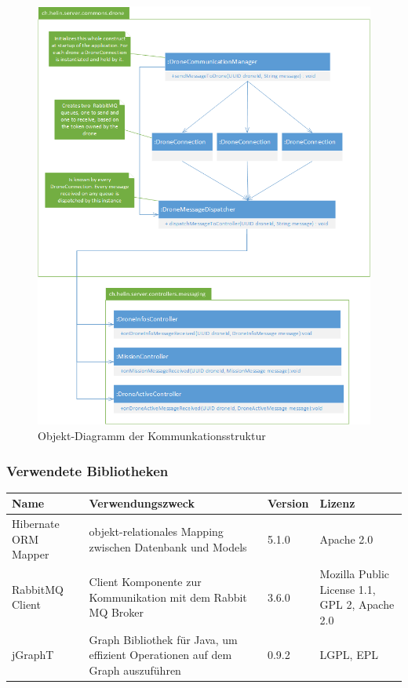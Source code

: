 \begin{figure}[H]
	\centering
	\includegraphics[width=0.8\paperwidth] {images/drone-communication-diagram.png}
	\caption{Objekt-Diagramm der Kommunkationsstruktur}
	\label{fig:drone-communication-diagram}
\end{figure}

\subsubsection{Verwendete Bibliotheken}


\begin{tabularx}{\textwidth}{|l|X|l|X|}
	\hline
	\textbf{Name} & \textbf{Verwendungszweck} & \textbf{Version} & \textbf{Lizenz} \\
	\hline \hline
	Hibernate ORM Mapper & objekt-relationales Mapping zwischen Datenbank und Models  & 5.1.0 & Apache 2.0\\
	\hline 
	RabbitMQ Client & Client Komponente zur Kommunikation mit dem Rabbit MQ Broker & 3.6.0 &  Mozilla Public License 1.1, GPL 2, Apache 2.0 \\
	\hline 
	jGraphT & Graph Bibliothek für Java, um effizient Operationen auf dem Graph auszuführen & 0.9.2 &  LGPL, EPL \\
	\hline 
\end{tabularx} \\

